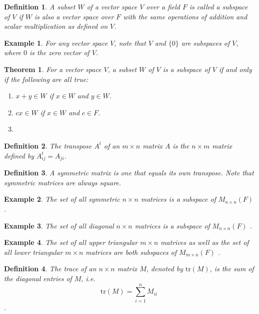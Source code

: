 \documentclass[a4paper]{article}
\newtheorem{mytheorem}{Theorem}
\newtheorem{example}{Example}
\newtheorem{mydef}{Definition}
\numberwithin{mytheorem}{section}
\numberwithin{mydef}{section}
\numberwithin{example}{section}
\begin{document}
\begin{mydef} A subset $W$ of a vector space $V$ over a field  $F$ is called a subspace of $V$ if $W$ is also a vector space over $F$ with the same operations of addition and scalar multiplication as defined on $V$.
\end{mydef}

\begin{example}
For any vector space $V$, note that $V$ and $\{ 0 \}$ are subspaces of $V$, where $0$ is the zero vector of $V$.
\end{example}

\begin{mytheorem} For a vector space $V$, a subset $W$ of $V$ is a subspace of $V$ if and only if the following are all true:
\begin{enumerate}
\item $x + y \in W$ if $x \in W$ and $y \in W$.
\item $cx \in W$ if $x \in W$ and $c \in F$. 
\item 
\end{enumerate}
\end{mytheorem}

\begin{mydef} The transpose $A^{t}$ of an $m \times n$ matrix $A$ is the $n \times m$ matrix defined by $A^{t}_{ij} = A_{ji}$. 
\end{mydef}

\begin{mydef} A symmetric matrix is one that equals its own transpose. Note that symmetric matrices are always square.
\end{mydef}

\begin{example} The set of all symmetric $n \times n$ matrices is a subspace of $M_{n \times n}(F)$. 
\end{example}

\begin{example} The set of all diagonal $n \times n$ matrices is a subspace of $M_{n \times n}(F)$ . 
\end{example}

\begin{example} The set of all upper triangular $m \times n$ matrices as well as the set of all lower triangular $m \times n$ matrices are both subspaces of $M_{m\times n}(F)$ . 
\end{example}

\begin{mydef} The trace of an $n \times n$ matrix $M$, denoted by $\text{tr}(M)$, is the sum of the diagonal entries of $M$, i.e. $$\text{tr}(M) = \sum^{n}_{i = 1}M_{ii}$$. 
\end{mydef}
\end{document}
